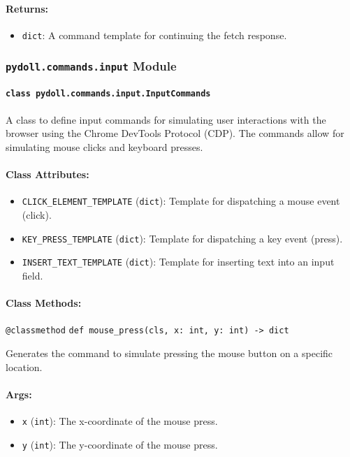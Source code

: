 \documentclass{article}
\begin{document}
\paragraph{Returns:}
\begin{itemize}
    \item \texttt{dict}: A command template for continuing the fetch response.
\end{itemize}

\subsubsection*{\texttt{pydoll.commands.input} Module}

\paragraph*{\texttt{class pydoll.commands.input.InputCommands}}
\noindent A class to define input commands for simulating user interactions with the browser using the Chrome DevTools Protocol (CDP). The commands allow for simulating mouse clicks and keyboard presses.

\paragraph{Class Attributes:}
\begin{itemize}
    \item \texttt{CLICK\_ELEMENT\_TEMPLATE} (\texttt{dict}): Template for dispatching a mouse event (click).
    \item \texttt{KEY\_PRESS\_TEMPLATE} (\texttt{dict}): Template for dispatching a key event (press).
    \item \texttt{INSERT\_TEXT\_TEMPLATE} (\texttt{dict}): Template for inserting text into an input field.
\end{itemize}

\paragraph{Class Methods:}
\noindent\texttt{@classmethod}
\noindent\texttt{def mouse\_press(cls, x: int, y: int) -> dict}

\noindent Generates the command to simulate pressing the mouse button on a specific location.

\paragraph{Args:}
\begin{itemize}
    \item \texttt{x} (\texttt{int}): The x-coordinate of the mouse press.
    \item \texttt{y} (\texttt{int}): The y-coordinate of the mouse press.
\end{itemize}
\end{document}
